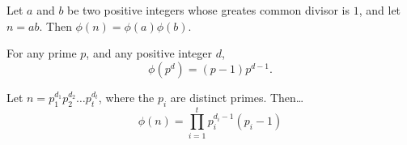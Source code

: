 \begin{lemma}
Let $a$ and $b$ be two positive integers whose greates common divisor is $1$, and let $n = ab$. Then $\phi(n) = \phi(a)\phi(b).$
\end{lemma}

\begin{proposition}
For any prime $p$, and any positive integer $d$,
$$\phi(p^d) = (p-1)p^{d-1}.$$
\end{proposition}

\begin{proposition}
Let $n = p_1^{d_1}p_2^{d_2}\dots p_t^{d_t}$, where the $p_i$ are distinct primes. Then\dots
$$\phi(n) = \prod^t_{i=1}p_i^{d_i-1}(p_i - 1)$$
\end{proposition}
